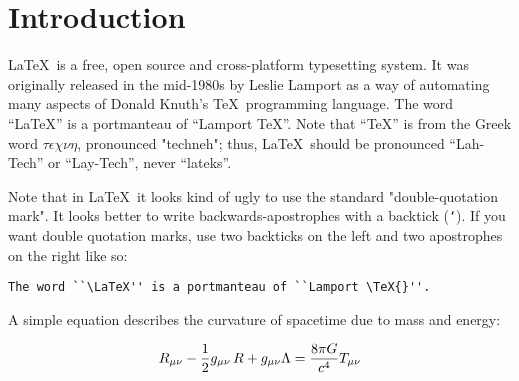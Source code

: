 \section{Introduction}

\LaTeX\ is a free, open source and cross-platform typesetting system. It was originally released in the mid-1980s by Leslie Lamport as a way of automating many aspects of Donald Knuth's \TeX\ programming language.
The word ``\LaTeX'' is a portmanteau of ``Lamport \TeX{}''.
Note that ``\TeX'' is from the Greek word $\tau\epsilon\chi\nu\eta$, pronounced "techneh";
thus, \LaTeX\ should be pronounced ``Lah-Tech'' or ``Lay-Tech'', never ``lateks''.

Note that in \LaTeX\ it looks kind of ugly to use the standard "double-quotation mark".
It looks better to write backwards-apostrophes with a backtick (\texttt{`}).
If you want double quotation marks, use two backticks on the left and two apostrophes on the right like so:

\begin{verbatim}
The word ``\LaTeX'' is a portmanteau of ``Lamport \TeX{}''.
\end{verbatim}

A simple equation describes the curvature of spacetime due to mass and energy:

\begin{equation}
    R_{\mu \nu} - {1 \over 2}g_{\mu \nu}\,R + g_{\mu \nu} \Lambda = {8 \pi G \over c^4} T_{\mu \nu}\label{eq:einstein-field-equations}
\end{equation}
